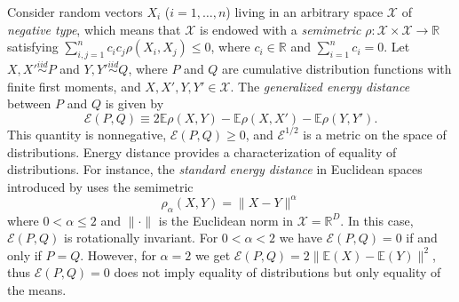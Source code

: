 \documentclass{article}
\newcommand\Energy{\mathcal{E}}
\newcommand\E{\mathbb{E}}
\begin{document}
Consider random vectors $X_i$ ($i=1,\dotsc,n$) living in an arbitrary space
$\mathcal{X}$ of \emph{negative type}, which means that $\mathcal{X}$
is endowed with a \emph{semimetric} 
$\rho: \mathcal{X}\times\mathcal{X} \to \mathbb{R}$ satisfying
$\sum_{i,j=1}^n c_i c_j \rho(X_i, X_j) \le 0$,
where $c_i \in \mathbb{R}$ and
$\sum_{i=1}^n c_i = 0$. 
Let $X,X' \stackrel{iid}{\sim} P$ and 
$Y,Y' \stackrel{iid}{\sim} Q$, where $P$ and $Q$ are cumulative
distribution functions with finite first moments, and 
$X,X',Y,Y' \in \mathcal{X}$. 
The \emph{generalized energy distance} between $P$ and $Q$ is
given by 
\begin{equation}
\label{eq:energy3}
\Energy(P, Q) \equiv 2 \E \rho(X,Y) - \E \rho(X, X') - \E \rho(Y,Y').
\end{equation} 
This quantity is nonnegative, $\Energy(P,Q) \ge 0$, and 
$\Energy^{1/2}$ is
a metric on the space of distributions. Energy distance provides
a characterization of equality of distributions.
For instance, the \emph{standard
energy distance} 
in Euclidean spaces 
introduced by \citet{Szkely2013} 
uses
the semimetric
\begin{equation}
\label{eq:rho_standard}
\rho_\alpha(X,Y) = \| X - Y\|^\alpha
\end{equation} 
where $0< \alpha \le 2$ and $\| \cdot \|$ is the
Euclidean norm in $\mathcal{X}=\mathbb{R}^D$. In this case, $\Energy(P,Q)$
is rotationally invariant. For $0<\alpha<2$ we have
$\Energy(P,Q) = 0$ if and only if $P=Q$. However, for $\alpha=2$
we get $\Energy(P,Q) = 2\| \E(X) - \E(Y) \|^2$, thus
$\Energy(P,Q)=0$ does 
not imply equality of distributions but only equality
of the means.
 
\end{document}
